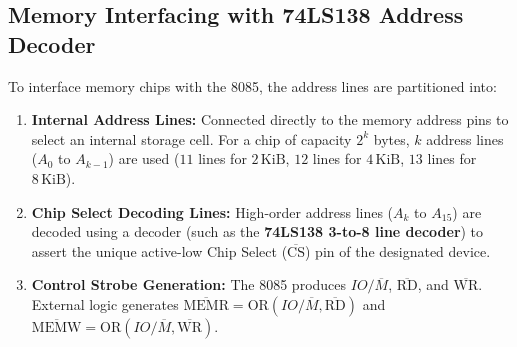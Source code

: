 \documentclass[12pt,a4paper]{article}
\begin{document}
\subsection{Memory Interfacing with 74LS138 Address Decoder}
To interface memory chips with the 8085, the address lines are partitioned into:
\begin{enumerate}[leftmargin=*]
  \item \textbf{Internal Address Lines:} Connected directly to the memory address pins to select an internal storage cell. For a chip of capacity $2^k$ bytes, $k$ address lines ($A_0$ to $A_{k-1}$) are used ($11$ lines for $2\,\mathrm{KiB}$, $12$ lines for $4\,\mathrm{KiB}$, $13$ lines for $8\,\mathrm{KiB}$).
  \item \textbf{Chip Select Decoding Lines:} High-order address lines ($A_k$ to $A_{15}$) are decoded using a decoder (such as the \textbf{74LS138 3-to-8 line decoder}) to assert the unique active-low Chip Select ($\overline{\mathrm{CS}}$) pin of the designated device.
  \item \textbf{Control Strobe Generation:} The 8085 produces $IO/\overline{M}$, $\overline{\mathrm{RD}}$, and $\overline{\mathrm{WR}}$. External logic generates $\overline{\mathrm{MEMR}} = \mathrm{OR}(IO/\overline{M}, \overline{\mathrm{RD}})$ and $\overline{\mathrm{MEMW}} = \mathrm{OR}(IO/\overline{M}, \overline{\mathrm{WR}})$.
\end{enumerate}
\end{document}
